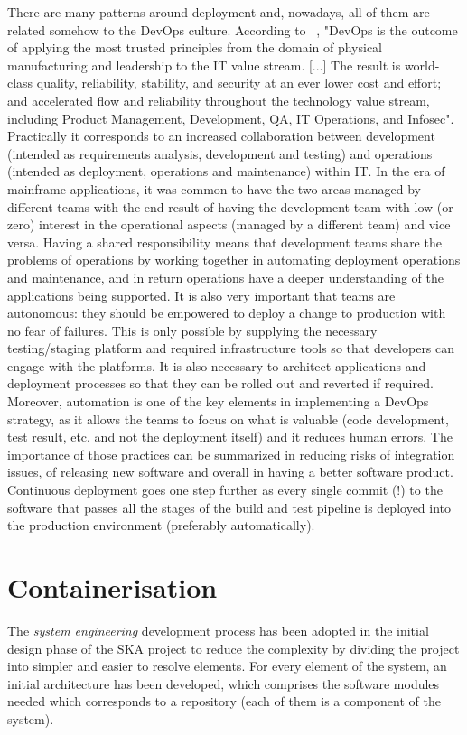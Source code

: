 \documentclass[a4paper,
               keeplastbox,   %
               ]{jacow}
\begin{document}
There are many patterns around deployment and, nowadays, all of them are related somehow to the DevOps culture. According to ~\cite{DevOps}, "DevOps is the outcome of applying the most trusted principles from the domain of physical manufacturing and leadership to the IT value stream. [...] The result is world-class quality, reliability, stability, and security at an ever lower cost and effort; and accelerated flow and reliability throughout the technology value stream, including Product Management, Development, QA, IT Operations, and Infosec". Practically it corresponds to an increased collaboration between development (intended as requirements analysis, development and testing) and operations (intended as deployment, operations and maintenance) within IT. In the era of mainframe applications, it was common to have the two areas managed by different teams with the end result of having the development team with low (or zero) interest in the operational aspects (managed by a different team) and vice versa. Having a shared responsibility means that development teams share the problems of operations by working together in automating deployment operations and maintenance, and in return operations have a deeper understanding of the applications being supported. It is also very important that teams are autonomous: they should be empowered to deploy a change to production with no fear of failures. This is only possible by supplying the necessary testing/staging platform and required infrastructure tools so that developers can engage with the platforms.  It is also necessary to architect applications and deployment processes so that they can be rolled out and reverted if required.
Moreover, automation is one of the key elements in implementing a DevOps strategy, as it allows the teams to focus on what is valuable (code development, test result, etc. and not the deployment itself) and it reduces human errors.
The importance of those practices can be summarized in reducing risks of integration issues, of releasing new software and overall in having a better software product.
Continuous deployment goes one step further as every single commit (!) to the software that passes all the stages of the build and test pipeline is deployed into the production environment (preferably automatically).

\section{Containerisation} \label{ska-tango-images}
The \textit{system engineering} development process has been adopted in the initial design phase of the SKA project to reduce the complexity by dividing the project into simpler and easier to resolve elements. For every element of the system, an initial architecture has been developed, which comprises the software modules needed which corresponds to a repository (each of them is a component of the system).
\end{document}
